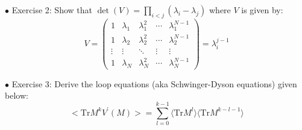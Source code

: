 \documentclass[letter,11pt]{article}
\begin{document}
\vspace{5mm} 
\begin{mdframed}[backgroundcolor=blue!3] 
	$\bullet$ Exercise 2: Show that $\det(V) = \prod_{i<j} (\lambda_i - \lambda_j)$ where $V$ is given by: 
	\begin{equation*}
		V = 
		\begin{pmatrix}
			1 & \lambda_1 & \lambda_{1}^{2} & \cdots & \lambda_{1}^{N-1} \\
			1 & \lambda_2 & \lambda_{2}^{2} & \cdots & \lambda_{2}^{N-1} \\ 
			\vdots  & \vdots  & \ddots & \vdots  & \vdots \\
			1 & \lambda_N & \lambda_{N}^{2} & \cdots & \lambda_{N}^{N-1} 
		\end{pmatrix} = \lambda_{i}^{j-1} 
	\end{equation*}
	
\end{mdframed} 

\begin{mdframed}[backgroundcolor=blue!3] 
	$\bullet$ Exercise 3: Derive the loop equations (aka Schwinger-Dyson equations) given below: \\ 
	\begin{equation}
		\label{eq:LE1} 
		\Big< \mbox{Tr} M^{k} V^{\prime}(M) \Big> = \sum_{l=0}^{k-1} \langle \mbox{Tr} M^{l} \rangle  \langle \mbox{Tr} M^{k-l-1} \rangle
	\end{equation} 
\end{mdframed}
\end{document}
